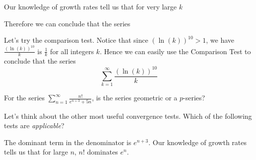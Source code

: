 \documentclass{ximera}
\begin{document}
\begin{exercise}
\begin{hint}
\begin{question}
Our knowledge of growth rates tell us that for very large $k$

\begin{multipleChoice}
\end{multipleChoice}

Therefore we can conclude that the series 

\begin{multipleChoice}
\end{multipleChoice}

Let's try the comparison test.  Notice that since $(\ln(k))^{10}>1$, we have
$\frac{(\ln(k))^{10}}{k}$ is   $\frac{1}{k}$ for all integers $k$.  
Hence we can easily use the Comparison Test to conclude that the series
\[
\sum^{\infty}_{k=1} \frac{ (\ln(k))^{10}}{k}
\]

\begin{multipleChoice}
\end{multipleChoice}


\end{question}



\begin{question}
For the series $\sum_{n=1}^{\infty}  \frac{n!}{e^{n+3}+5n}$, is the series geometric or a $p$-series?

\begin{multipleChoice}
\end{multipleChoice}

Let's think about the other most useful convergence tests.  Which of the following tests are \emph{applicable}?

\begin{selectAll}
\end{selectAll}

The dominant term in the denominator is $e^{n+3}$. Our knowledge of growth rates tells us 
that for large $n$,  $n!$ dominates $e^n$. 


\end{question}
\end{hint}
\end{exercise}
\end{document}
